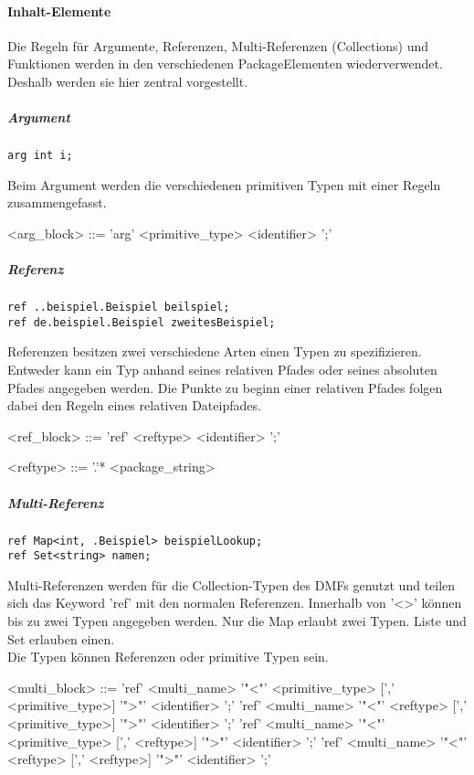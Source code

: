 \documentclass[./einleitung.tex]{subfiles}
\begin{document}
\paragraph{Inhalt-Elemente}
Die Regeln für Argumente, Referenzen, Multi-Referenzen (Collections) und Funktionen werden in den verschiedenen PackageElementen wiederverwendet. Deshalb werden sie hier zentral vorgestellt.

\subparagraph{Argument}
\begin{lstlisting}
arg int i;
\end{lstlisting}
Beim Argument werden die verschiedenen primitiven Typen mit einer Regeln zusammengefasst. 
\begin{grammar}
<arg_block> ::= 'arg' <primitive_type> <identifier> ';'
\end{grammar}

\subparagraph{Referenz}
\begin{lstlisting}
ref ..beispiel.Beispiel beilspiel;
ref de.beispiel.Beispiel zweitesBeispiel;
\end{lstlisting}
Referenzen besitzen zwei verschiedene Arten einen Typen zu spezifizieren. \\
Entweder kann ein Typ anhand seines relativen Pfades oder seines absoluten Pfades angegeben werden. Die Punkte zu beginn einer relativen Pfades folgen dabei den Regeln eines relativen Dateipfades.
\begin{grammar}
<ref_block> ::= 'ref' <reftype> <identifier> ';'

<reftype> ::= '.'* <package_string>
\end{grammar}

\subparagraph{Multi-Referenz}
\begin{lstlisting}
ref Map<int, .Beispiel> beispielLookup;
ref Set<string> namen;
\end{lstlisting}
Multi-Referenzen werden für die Collection-Typen des DMFs genutzt und teilen sich das Keyword 'ref' mit den normalen Referenzen. Innerhalb von '<>' können bis zu zwei Typen angegeben werden. Nur die Map erlaubt zwei Typen. Liste und Set erlauben einen. \\
Die Typen können Referenzen oder primitive Typen sein.
\begin{grammar}
<multi_block> ::= 'ref' <multi_name> '"<"' <primitive_type> [',' <primitive_type>] '">"' <identifier> ';'
\alt 'ref' <multi_name> '"<"' <reftype> [',' <primitive_type>] '">"' <identifier> ';'
\alt 'ref' <multi_name> '"<"' <primitive_type> [',' <reftype>] '">"' <identifier> ';'
\alt 'ref' <multi_name> '"<"' <reftype> [',' <reftype>] '">"' <identifier> ';'
\end{grammar}
\end{document}
